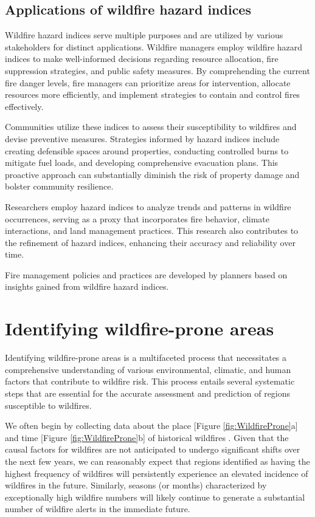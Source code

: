 \documentclass[
  12 pt,
]{Nemilov}
\begin{document}
\subsection{Applications of wildfire hazard indices}\label{applications-of-wildfire-hazard-indices}

Wildfire hazard indices serve multiple purposes and are utilized by various stakeholders for distinct applications. Wildfire managers employ wildfire hazard indices to make well-informed decisions regarding resource allocation, fire suppression strategies, and public safety measures. By comprehending the current fire danger levels, fire managers can prioritize areas for intervention, allocate resources more efficiently, and implement strategies to contain and control fires effectively.

Communities utilize these indices to assess their susceptibility to wildfires and devise preventive measures. Strategies informed by hazard indices include creating defensible spaces around properties, conducting controlled burns to mitigate fuel loads, and developing comprehensive evacuation plans. This proactive approach can substantially diminish the risk of property damage and bolster community resilience.

Researchers employ hazard indices to analyze trends and patterns in wildfire occurrences, serving as a proxy that incorporates fire behavior, climate interactions, and land management practices. This research also contributes to the refinement of hazard indices, enhancing their accuracy and reliability over time.

Fire management policies and practices are developed by planners based on insights gained from wildfire hazard indices.

\section{Identifying wildfire-prone areas}\label{identifying-wildfire-prone-areas}

Identifying wildfire-prone areas is a multifaceted process that necessitates a comprehensive understanding of various environmental, climatic, and human factors that contribute to wildfire risk. This process entails several systematic steps that are essential for the accurate assessment and prediction of regions susceptible to wildfires.

We often begin by collecting data about the place {[}Figure \ref{fig:WildfireProne}a{]} and time {[}Figure \ref{fig:WildfireProne}b{]} of historical wildfires \citep{fire-compendium22}. Given that the causal factors for wildfires are not anticipated to undergo significant shifts over the next few years, we can reasonably expect that regions identified as having the highest frequency of wildfires will persistently experience an elevated incidence of wildfires in the future. Similarly, seasons (or months) characterized by exceptionally high wildfire numbers will likely continue to generate a substantial number of wildfire alerts in the immediate future.
\end{document}
